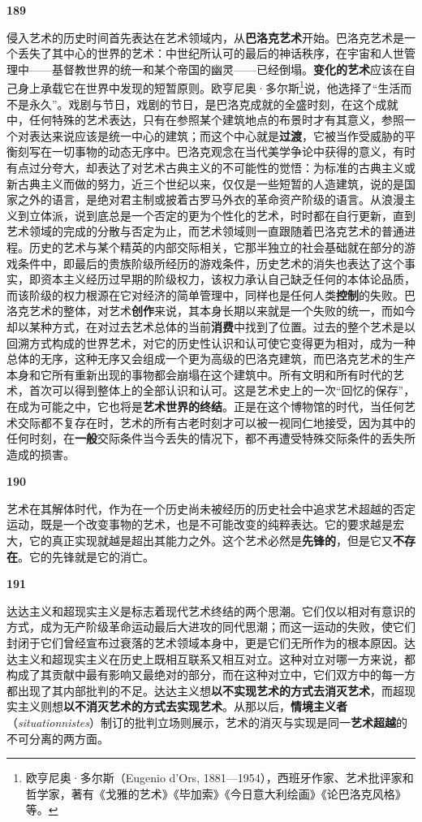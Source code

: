 \documentclass[fontset=fandol, a4paper, 12pt, openright]{ctexbook}
\makeatletter
\newcommand{\thesis}[1]{%
    \par\vspace{1.5em}%
    {\centering \textbf{\Large #1}\par}%
    \nobreak\vspace{0.5em}\nobreak
    \@afterindenttrue %
    \@afterheading    %
}
\makeatother
\begin{document}
\thesis{189}
侵入艺术的历史时间首先表达在艺术领域内，从\textbf{巴洛克艺术}开始。巴洛克艺术是一个丢失了其中心的世界的艺术：中世纪所认可的最后的神话秩序，在宇宙和人世管理中——基督教世界的统一和某个帝国的幽灵——已经倒塌。\textbf{变化的艺术}应该在自己身上承载它在世界中发现的短暂原则。欧亨尼奥·多尔斯\footnote{欧亨尼奥·多尔斯（Eugenio d'Ors, 1881—1954），西班牙作家、艺术批评家和哲学家，著有《戈雅的艺术》《毕加索》《今日意大利绘画》《论巴洛克风格》等。}说，他选择了“生活而不是永久”。戏剧与节日，戏剧的节日，是巴洛克成就的全盛时刻，在这个成就中，任何特殊的艺术表达，只有在参照某个建筑地点的布景时才有其意义，参照一个对表达来说应该是统一中心的建筑；而这个中心就是\textbf{过渡}，它被当作受威胁的平衡刻写在一切事物的动态无序中。巴洛克观念在当代美学争论中获得的意义，有时有点过分夸大，却表达了对艺术古典主义的不可能性的觉悟：为标准的古典主义或新古典主义而做的努力，近三个世纪以来，仅仅是一些短暂的人造建筑，说的是国家之外的语言，是绝对君主制或披着古罗马外衣的革命资产阶级的语言。从浪漫主义到立体派，说到底总是一个否定的更为个性化的艺术，时时都在自行更新，直到艺术领域的完成的分散与否定为止，而艺术领域则一直跟随着巴洛克艺术的普通进程。历史的艺术与某个精英的内部交际相关，它那半独立的社会基础就在部分的游戏条件中，即最后的贵族阶级所经历的游戏条件，历史艺术的消失也表达了这个事实，即资本主义经历过早期的阶级权力，该权力承认自己缺乏任何的本体论品质，而该阶级的权力根源在它对经济的简单管理中，同样也是任何人类\textbf{控制}的失败。巴洛克艺术的整体，对艺术\textbf{创作}来说，其本身长期以来就是一个失败的统一，而如今却以某种方式，在对过去艺术总体的当前\textbf{消费}中找到了位置。过去的整个艺术是以回溯方式构成的世界艺术，对它的历史性认识和认可使它变得更为相对，成为一种总体的无序，这种无序又会组成一个更为高级的巴洛克建筑，而巴洛克艺术的生产本身和它所有重新出现的事物都会崩塌在这个建筑中。所有文明和所有时代的艺术，首次可以得到整体上的全部认识和认可。这是艺术史上的一次“回忆的保存”，在成为可能之中，它也将是\textbf{艺术世界的终结}。正是在这个博物馆的时代，当任何艺术交际都不复存在时，艺术的所有古老时刻才可以被一视同仁地接受，因为其中的任何时刻，在\textbf{一般}交际条件当今丢失的情况下，都不再遭受特殊交际条件的丢失所造成的损害。

\thesis{190}
艺术在其解体时代，作为在一个历史尚未被经历的历史社会中追求艺术超越的否定运动，既是一个改变事物的艺术，也是不可能改变的纯粹表达。它的要求越是宏大，它的真正实现就越是超出其能力之外。这个艺术必然是\textbf{先锋的}，但是它又\textbf{不存在}。它的先锋就是它的消亡。

\thesis{191}
达达主义和超现实主义是标志着现代艺术终结的两个思潮。它们仅以相对有意识的方式，成为无产阶级革命运动最后大进攻的同代思潮；而这一运动的失败，使它们封闭于它们曾经宣布过衰落的艺术领域本身中，更是它们无所作为的根本原因。达达主义和超现实主义在历史上既相互联系又相互对立。这种对立对哪一方来说，都构成了其贡献中最有影响又最绝对的部分，而在这种对立中，它们双方中的每一方都出现了其内部批判的不足。达达主义想\textbf{以不实现艺术的方式去消灭艺术}，而超现实主义则想\textbf{以不消灭艺术的方式去实现艺术}。从那以后，\textbf{情境主义者}（\textit{situationnistes}）制订的批判立场则展示，艺术的消灭与实现是同一\textbf{艺术超越}的不可分离的两方面。
\end{document}
